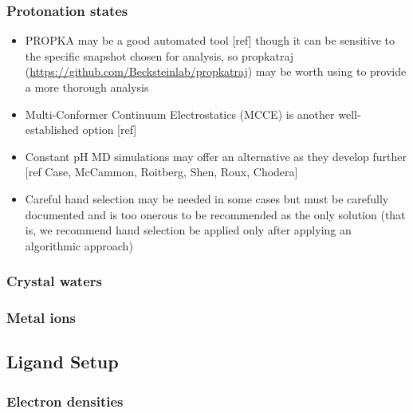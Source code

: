 \documentclass[9pt,bestpractices]{livecoms}
\begin{document}
 \subsubsection{Protonation states}
     \begin{itemize}
    \item PROPKA may be a good automated tool [ref] though it can be sensitive to the specific snapshot chosen for analysis, so propkatraj (\url{https://github.com/Becksteinlab/propkatraj}) may be worth using to provide a more thorough analysis
    \item Multi-Conformer Continuum Electrostatics (MCCE) is another well-established option [ref] 
    \item Constant pH MD simulations may offer an alternative as they develop further [ref  Case, McCammon, Roitberg, Shen, Roux, Chodera]
    \item Careful hand selection may be needed in some cases but must be carefully documented and is too onerous to be recommended as the only solution (that is, we recommend hand selection be applied only after applying an algorithmic approach)
    \end{itemize}
    
\subsubsection{Crystal waters}
 
\subsubsection{Metal ions}

\subsection{Ligand Setup}
\label{sec:stage2}

\subsubsection{Electron densities}
\end{document}
